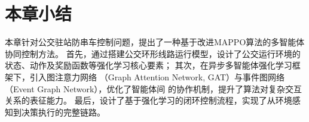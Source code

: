 


\section{本章小结}


本章针对公交驻站防串车控制问题，提出了一种基于改进MAPPO算法的多智能体协同控制方法。
首先，通过搭建公交环形线路运行模型，设计了公交运行环境的状态、动作及奖励函数等强化学习核心要素；
其次，在异步多智能体强化学习框架下，引入图注意力网络
（Graph Attention Network, GAT）与事件图网络（Event Graph Network），优化了智能体间
的协作机制，提升了算法对复杂交互关系的表征能力。
最后，设计了基于强化学习的闭环控制流程，实现了从环境感知到决策执行的完整链路。





